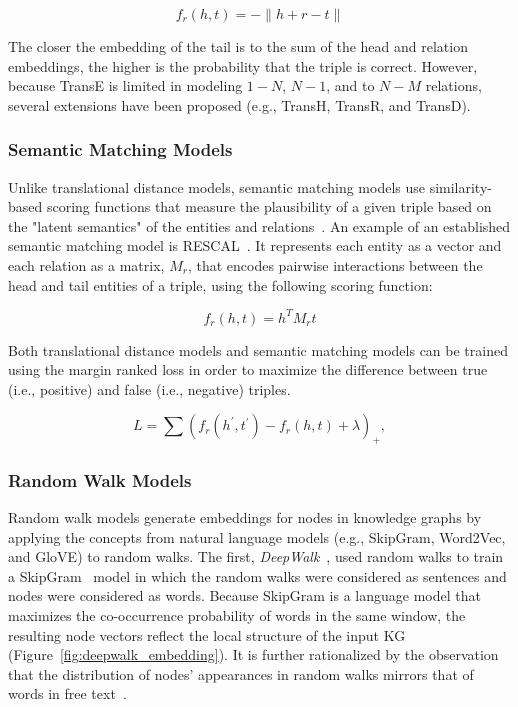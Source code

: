 \begin{equation}\label{eq:trans_e_scoring_function}
    f_r(h,t) = - \|h + r - t\|
\end{equation}

The closer the embedding of the tail is to the sum of the head and relation embeddings, the higher is the probability that the triple is correct.
However, because TransE is limited in modeling $1-N$, $N-1$, and to $N-M$ relations, several extensions have been proposed (e.g., TransH, TransR, and TransD).

\subsubsection{Semantic Matching Models}

Unlike translational distance models, semantic matching models use similarity-based scoring functions that measure the plausibility of a given triple based on the "latent semantics" of the entities and relations~\cite{Wang2017}.
An example of an established semantic matching model is RESCAL~\cite{Nickel2011}.
It represents each entity as a vector and each relation as a matrix, $M_r$, that encodes pairwise interactions between the head and tail entities of a triple, using the following scoring function:

\begin{equation}\label{eq:rescal_scoring_function}
    f_r(h,t) = h^{T} M_{r} t
\end{equation}

Both translational distance models and semantic matching models can be trained using the margin ranked loss in order to maximize the difference between true (i.e., positive) and false (i.e., negative) triples.

\begin{equation}\label{eq:margin_ranked_loss}
    L = \sum_{}^{}(f_r(h^{'},t^{'}) - f_r(h,t) + \lambda )_+,
\end{equation}

\subsubsection{Random Walk Models}

Random walk models generate embeddings for nodes in knowledge graphs by applying the concepts from natural language models (e.g., SkipGram, Word2Vec, and GloVE) to random walks.
The first, \textit{DeepWalk}~\cite{Perozzi2014}, used random walks to train a SkipGram~\cite{Mikolov2013} model in which the random walks were considered as sentences and nodes were considered as words.
Because SkipGram is a language model that maximizes the co-occurrence probability of words in the same window, the resulting node vectors reflect the local structure of the input \ac{KG} (Figure~\ref{fig:deepwalk_embedding}).
It is further rationalized by the observation that the distribution of nodes' appearances in random walks mirrors that of words in free text~\cite{Perozzi2014}.

